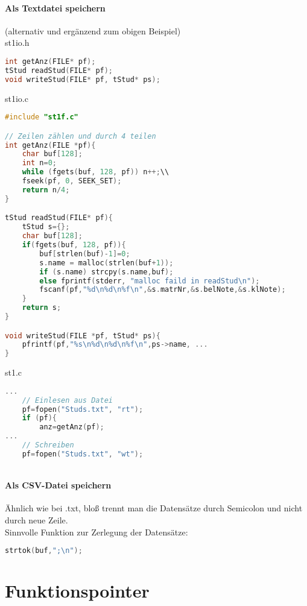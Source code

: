 \paragraph{Als Textdatei speichern} (alternativ und ergänzend zum obigen Beispiel)\\
st1io.h
\begin{lstlisting}[language=C]
int getAnz(FILE* pf);
tStud readStud(FILE* pf);
void writeStud(FILE* pf, tStud* ps);
\end{lstlisting}

st1io.c
\begin{lstlisting}[language=C]
#include "st1f.c"

// Zeilen zählen und durch 4 teilen
int getAnz(FILE *pf){
	char buf[128];
	int n=0;
	while (fgets(buf, 128, pf)) n++;\\
	fseek(pf, 0, SEEK_SET);
	return n/4;
}

tStud readStud(FILE* pf){
	tStud s={};
	char buf[128];
	if(fgets(buf, 128, pf)){
		buf[strlen(buf)-1]=0;
		s.name = malloc(strlen(buf+1));
		if (s.name) strcpy(s.name,buf);
		else fprintf(stderr, "malloc faild in readStud\n");
		fscanf(pf,"%d\n%d\n%f\n",&s.matrNr,&s.belNote,&s.klNote);
	}
	return s;
}

void writeStud(FILE *pf, tStud* ps){
	pfrintf(pf,"%s\n%d\n%d\n%f\n",ps->name, ...
}


\end{lstlisting}

st1.c
\begin{lstlisting}[language=C]
...
	// Einlesen aus Datei
	pf=fopen("Studs.txt", "rt");
	if (pf){
		anz=getAnz(pf);		
...
	// Schreiben
	pf=fopen("Studs.txt", "wt");
		
\end{lstlisting}

\paragraph{Als CSV-Datei speichern}

Ähnlich wie bei .txt, bloß trennt man die Datensätze durch Semicolon und nicht durch neue Zeile.\\
Sinnvolle Funktion zur Zerlegung der Datensätze: 
\begin{lstlisting}[language=C]
strtok(buf,";\n");
\end{lstlisting}

\section{Funktionspointer}

